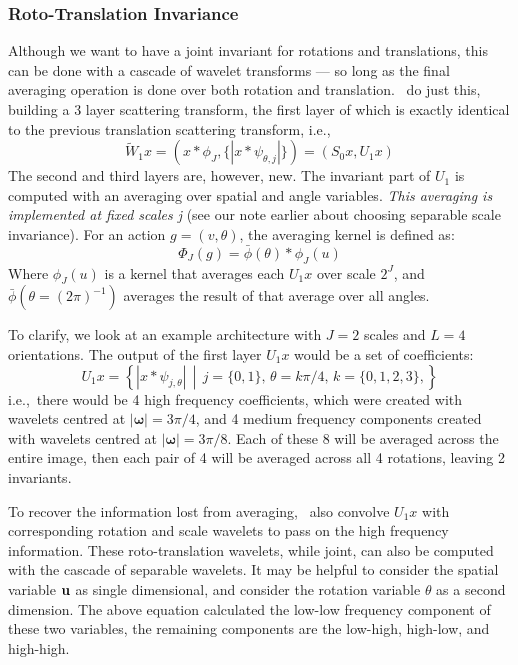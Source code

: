 \subsubsection{Roto-Translation Invariance}
  Although we want to have a joint invariant for rotations and translations,
  this can be done with a cascade of wavelet transforms --- so long as the
  final averaging operation is done over both rotation and translation. \Sifre\
  do just this, building a 3 layer scattering transform, the first layer of
  which is exactly identical to the previous translation scattering transform,
  i.e.,\
  \begin{equation}
    \tilde{W}_1 x = \left( x \ast \phi_J, \{|x \ast \psi_{\theta, j}|\} \right)
      = (S_0x, U_1x)
  \end{equation}
  The second and third layers are, however, new. The invariant part of $U_1$ is
  computed with an averaging over spatial and angle variables. \emph{This
  averaging is implemented at fixed scales j} (see our note earlier about
  choosing separable scale invariance). For an action $g = (v, \theta)$, the
  averaging kernel is defined as:
  \begin{equation}
    \Phi_J(g) =  \bar{\phi}(\theta) \ast \phi_J(u)
  \end{equation}
  Where $\phi_J(u)$ is a kernel that averages each $U_1x$ over scale $2^J$,
  and $ \bar{\phi}(\theta= (2\pi)^{-1})$ averages the result of that average over all angles.

  To clarify, we look at an example architecture with $J=2$ scales and $L=4$
  orientations. The output of the first layer $U_1x$ would be a set of
  coefficients:
  \begin{equation}
    U_1x = \left\{ |x \ast \psi_{j, \theta} | \, \middle| \, j=\{0,1\}, \,
    \theta=k\pi/4, \, k= \{0,1,2,3\} ,\right\}
  \end{equation}
  i.e.,\ there would be 4 high frequency coefficients, which were created with
  wavelets centred at $|\bm{\omega}| = 3\pi/4$, and 4 medium frequency components
  created with wavelets centred at $|\bm{\omega}| = 3\pi/8$. Each of these 8 will
  be averaged across the entire image, then each pair of 4 will be averaged
  across all 4 rotations, leaving 2 invariants.

  To recover the information lost from averaging, \Sifre\ also convolve $U_1x$
  with corresponding rotation and scale wavelets to pass on the high frequency
  information. These roto-translation wavelets, while joint, can also be computed
  with the cascade of separable wavelets. It may be helpful to consider the
  spatial variable $\mathbf{u}$ as single dimensional, and consider the rotation
  variable $\theta$ as a second dimension. The above equation calculated the low-low
  frequency component of these two variables, the remaining components are the
  low-high, high-low, and high-high. 

